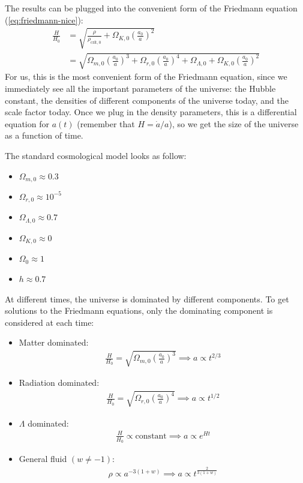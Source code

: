 The results can be plugged into the convenient form of the Friedmann equation (\ref{eq:friedmann-nice}):
\begin{align*}
	\frac{H}{H_0} 
	&= \sqrt{\frac{\rho}{\rho_{\text{crit}, 0}} + \Omega_{K,0} \left( \frac{a_0}{a} \right)^2 }\\
	&= \sqrt{
		\Omega_{m,0} \left( \frac{a_0}{a} \right)^3
		+ \Omega_{r,0} \left( \frac{a_0}{a} \right)^4
		+ \Omega_{\Lambda,0}
		+ \Omega_{K,0} \left( \frac{a_0}{a} \right)^2
	}
\end{align*}
For us, this is the most convenient form of the Friedmann equation, since we immediately see all the important parameters of the universe: the Hubble constant, the densities of different components of the universe today, and the scale factor today.
Once we plug in the density parameters, this is a differential equation for $a(t)$ (remember that $H = \dot{a}/a$), so we get the size of the universe as a function of time.

The standard cosmological model looks as follow:
\begin{itemize}
	\item $\Omega_{m,0} \approx 0.3$
	\item $\Omega_{r,0} \approx 10^{-5}$
	\item $\Omega_{\Lambda,0} \approx 0.7$
	\item $\Omega_{K,0} \approx 0$
	\item $\Omega_0 \approx 1$
	\item $h \approx 0.7$
\end{itemize}

At different times, the universe is dominated by different components.
To get solutions to the Friedmann equations, only the dominating component is considered at each time:
\begin{itemize}
	\item Matter dominated:
	\begin{align*}
		\frac{H}{H_0} = \sqrt{\Omega_{m,0} \left( \frac{a_0}{a}\right)^3}
		\implies a \propto t^{2/3}
	\end{align*}
	\item Radiation dominated:
	\begin{align*}
		\frac{H}{H_0} = \sqrt{\Omega_{r,0} \left( \frac{a_0}{a} \right)^4}
		\implies a \propto t^{1/2}
	\end{align*}
	\item $\Lambda$ dominated:
	\begin{align*}
		\frac{H}{H_0} \propto \text{constant}
		\implies a \propto e^{H t}
	\end{align*}
	\item General fluid $(w \neq -1)$:
	\begin{align*}
		\rho \propto a^{-3(1+w)} \implies a \propto t^{\frac{2}{3(1+w)}}
	\end{align*}
\end{itemize}

